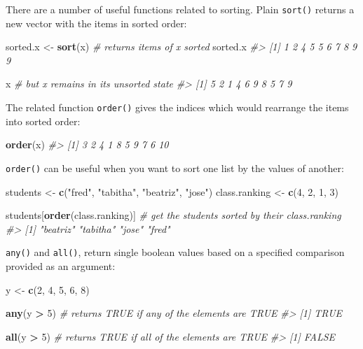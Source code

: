 \documentclass[]{book}
\newenvironment{Shaded}{\begin{snugshade}}{\end{snugshade}}
\newcommand{\CommentTok}[1]{\textcolor[rgb]{0.56,0.35,0.01}{\textit{#1}}}
\newcommand{\DecValTok}[1]{\textcolor[rgb]{0.00,0.00,0.81}{#1}}
\newcommand{\KeywordTok}[1]{\textcolor[rgb]{0.13,0.29,0.53}{\textbf{#1}}}
\newcommand{\NormalTok}[1]{#1}
\newcommand{\OperatorTok}[1]{\textcolor[rgb]{0.81,0.36,0.00}{\textbf{#1}}}
\newcommand{\StringTok}[1]{\textcolor[rgb]{0.31,0.60,0.02}{#1}}
\theoremstyle{definition}
\theoremstyle{definition}
\theoremstyle{definition}
\theoremstyle{remark}
\begin{document}
There are a number of useful functions related to sorting. Plain
\texttt{sort()} returns a new vector with the items in sorted order:

\begin{Shaded}
\begin{Highlighting}[]
\NormalTok{sorted.x <-}\StringTok{ }\KeywordTok{sort}\NormalTok{(x)  }\CommentTok{# returns items of x sorted}
\NormalTok{sorted.x}
\CommentTok{#>  [1] 1 2 4 5 5 6 7 8 9 9}

\NormalTok{x        }\CommentTok{# but x remains in its unsorted state}
\CommentTok{#>  [1] 5 2 1 4 6 9 8 5 7 9}
\end{Highlighting}
\end{Shaded}

The related function \texttt{order()} gives the indices which would
rearrange the items into sorted order:

\begin{Shaded}
\begin{Highlighting}[]
\KeywordTok{order}\NormalTok{(x)}
\CommentTok{#>  [1]  3  2  4  1  8  5  9  7  6 10}
\end{Highlighting}
\end{Shaded}

\texttt{order()} can be useful when you want to sort one list by the
values of another:

\begin{Shaded}
\begin{Highlighting}[]
\NormalTok{students <-}\StringTok{ }\KeywordTok{c}\NormalTok{(}\StringTok{"fred"}\NormalTok{, }\StringTok{"tabitha"}\NormalTok{, }\StringTok{"beatriz"}\NormalTok{, }\StringTok{"jose"}\NormalTok{)}
\NormalTok{class.ranking <-}\StringTok{ }\KeywordTok{c}\NormalTok{(}\DecValTok{4}\NormalTok{, }\DecValTok{2}\NormalTok{, }\DecValTok{1}\NormalTok{, }\DecValTok{3}\NormalTok{)}

\NormalTok{students[}\KeywordTok{order}\NormalTok{(class.ranking)]  }\CommentTok{# get the students sorted by their class.ranking}
\CommentTok{#> [1] "beatriz" "tabitha" "jose"    "fred"}
\end{Highlighting}
\end{Shaded}

\texttt{any()} and \texttt{all()}, return single boolean values based on
a specified comparison provided as an argument:

\begin{Shaded}
\begin{Highlighting}[]
\NormalTok{y <-}\StringTok{ }\KeywordTok{c}\NormalTok{(}\DecValTok{2}\NormalTok{, }\DecValTok{4}\NormalTok{, }\DecValTok{5}\NormalTok{, }\DecValTok{6}\NormalTok{, }\DecValTok{8}\NormalTok{)}

\KeywordTok{any}\NormalTok{(y }\OperatorTok{>}\StringTok{ }\DecValTok{5}\NormalTok{) }\CommentTok{# returns TRUE if any of the elements are TRUE}
\CommentTok{#> [1] TRUE}

\KeywordTok{all}\NormalTok{(y }\OperatorTok{>}\StringTok{ }\DecValTok{5}\NormalTok{) }\CommentTok{# returns TRUE if all of the elements are TRUE}
\CommentTok{#> [1] FALSE}
\end{Highlighting}
\end{Shaded}
\end{document}
